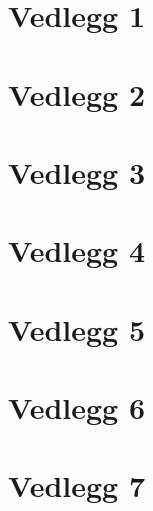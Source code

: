 \appendix

\chapter{Vedlegg 1}


\chapter{Vedlegg 2}


\chapter{Vedlegg 3}





\chapter{Vedlegg 4}


\chapter{Vedlegg 5}


\chapter{Vedlegg 6}


\chapter{Vedlegg 7}
